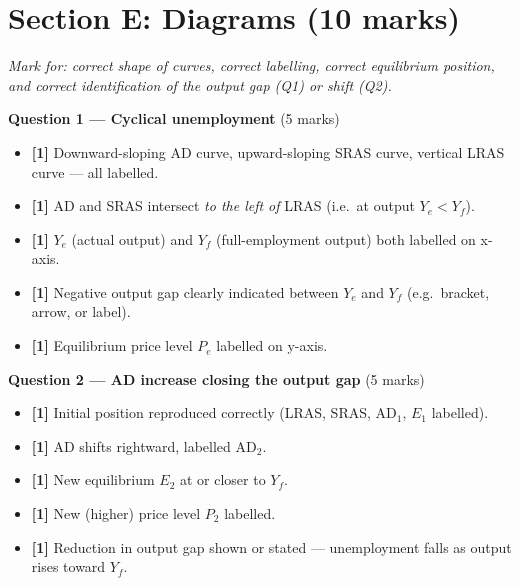 \documentclass[12pt,a4paper]{article}
\begin{document}
\section*{Section E: Diagrams (10 marks)}

\textit{Mark for: correct shape of curves, correct labelling, correct equilibrium position, and correct identification of the output gap (Q1) or shift (Q2).}

\vspace{0.5em}

\textbf{Question 1 --- Cyclical unemployment} \hfill (5 marks)

\begin{itemize}
    \item \textbf{[1]} Downward-sloping AD curve, upward-sloping SRAS curve, vertical LRAS curve --- all labelled.
    \item \textbf{[1]} AD and SRAS intersect \textit{to the left of} LRAS (i.e.\ at output $Y_e < Y_f$).
    \item \textbf{[1]} $Y_e$ (actual output) and $Y_f$ (full-employment output) both labelled on x-axis.
    \item \textbf{[1]} Negative output gap clearly indicated between $Y_e$ and $Y_f$ (e.g.\ bracket, arrow, or label).
    \item \textbf{[1]} Equilibrium price level $P_e$ labelled on y-axis.
\end{itemize}

\vspace{0.8em}

\textbf{Question 2 --- AD increase closing the output gap} \hfill (5 marks)

\begin{itemize}
    \item \textbf{[1]} Initial position reproduced correctly (LRAS, SRAS, AD$_1$, $E_1$ labelled).
    \item \textbf{[1]} AD shifts rightward, labelled AD$_2$.
    \item \textbf{[1]} New equilibrium $E_2$ at or closer to $Y_f$.
    \item \textbf{[1]} New (higher) price level $P_2$ labelled.
    \item \textbf{[1]} Reduction in output gap shown or stated --- unemployment falls as output rises toward $Y_f$.
\end{itemize}

\newpage

\end{document}
